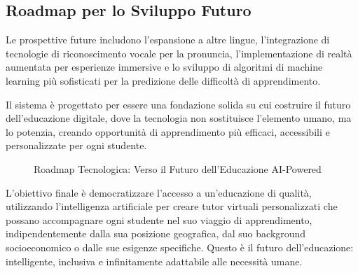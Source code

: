 \documentclass[12pt,a4paper]{article}
\begin{document}
\subsection{Roadmap per lo Sviluppo Futuro}
\label{subsec:future-roadmap}

Le prospettive future includono l'espansione a altre lingue, l'integrazione di tecnologie di riconoscimento vocale per la pronuncia, l'implementazione di realtà aumentata per esperienze immersive e lo sviluppo di algoritmi di machine learning più sofisticati per la predizione delle difficoltà di apprendimento.

Il sistema è progettato per essere una fondazione solida su cui costruire il futuro dell'educazione digitale, dove la tecnologia non sostituisce l'elemento umano, ma lo potenzia, creando opportunità di apprendimento più efficaci, accessibili e personalizzate per ogni studente.

\begin{figure}[H]
\centering
{}
\caption{Roadmap Tecnologica: Verso il Futuro dell'Educazione AI-Powered}
\label{fig:future-roadmap}
\end{figure}

L'obiettivo finale è democratizzare l'accesso a un'educazione di qualità, utilizzando l'intelligenza artificiale per creare tutor virtuali personalizzati che possano accompagnare ogni studente nel suo viaggio di apprendimento, indipendentemente dalla sua posizione geografica, dal suo background socioeconomico o dalle sue esigenze specifiche. Questo è il futuro dell'educazione: intelligente, inclusiva e infinitamente adattabile alle necessità umane.
\end{document}
